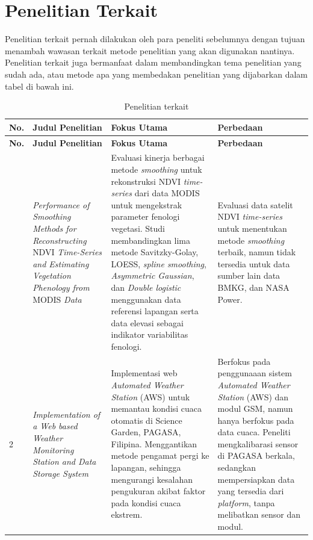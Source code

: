 \section{Penelitian Terkait}
Penelitian terkait pernah dilakukan oleh para peneliti sebelumnya dengan tujuan menambah wawasan terkait metode penelitian yang akan digunakan nantinya. Penelitian terkait juga bermanfaat dalam membandingkan tema penelitian yang sudah ada, atau metode apa yang membedakan penelitian \saya{}  yang dijabarkan dalam tabel di bawah ini.

\renewcommand{\arraystretch}{1.5} 
\begin{longtable}{|p{}|p{}|p{}|p{}|}
\caption{Penelitian terkait} \label{tab:penelitian_terkait} \\
\hline
\textbf{No.} & \textbf{Judul Penelitian} & \textbf{Fokus Utama} & \textbf{Perbedaan} \\ \hline
\endfirsthead
\hline
\textbf{No.} & \textbf{Judul Penelitian} & \textbf{Fokus Utama} & \textbf{Perbedaan} \\ \hline
\endhead
\hline
\endfoot
\hline
\endlastfoot
1 & \textit{Performance of Smoothing Methods for Reconstructing} NDVI \textit{Time-Series and Estimating Vegetation Phenology from} MODIS \textit{Data} \parencite{cai2017} & 
Evaluasi kinerja berbagai metode \textit{smoothing} untuk rekonstruksi NDVI \textit{time-series} dari data MODIS untuk mengekstrak parameter fenologi vegetasi. Studi membandingkan lima metode Savitzky-Golay, LOESS, \textit{spline smoothing}, \textit{Asymmetric Gaussian}, dan \textit{Double logistic}
menggunakan data referensi lapangan serta data elevasi sebagai indikator variabilitas fenologi. & 
Evaluasi data satelit NDVI \textit{time-series} untuk menentukan metode \textit{smoothing} terbaik, namun tidak tersedia untuk data sumber lain data BMKG, dan NASA Power. \\ \hline
2 & \textit{Implementation of a Web based Weather Monitoring Station and Data Storage System} \parencite{cesar2019} & Implementasi web \textit{Automated Weather Station} (AWS) untuk memantau kondisi cuaca otomatis di Science Garden, PAGASA, Filipina. Menggantikan metode pengamat pergi ke lapangan, sehingga mengurangi kesalahan pengukuran akibat faktor pada kondisi cuaca ekstrem. & 
Berfokus pada penggunaaan sistem \textit{Automated Weather Station} (AWS) dan modul GSM, namun hanya berfokus pada data cuaca. Peneliti mengkalibarasi sensor di PAGASA berkala, sedangkan \saya{} mempersiapkan data yang tersedia dari \textit{platform}, tanpa melibatkan sensor dan modul. \\ \hline

\end{longtable}
